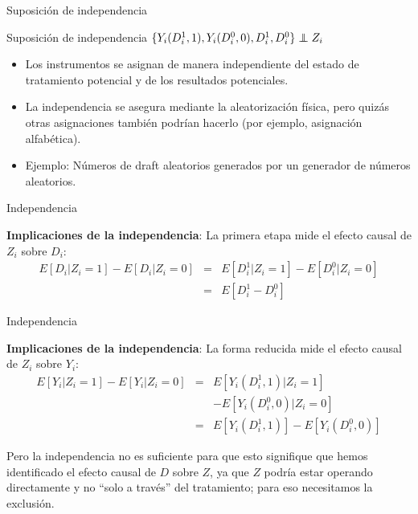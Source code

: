 \documentclass{beamer}
\newcommand\independent{\protect\mathpalette{\protect\independenT}{\perp}}
\def\independenT#1#2{\mathrel{\rlap{$#1#2$}\mkern2mu{#1#2}}}
\begin{document}
\begin{frame}{Suposición de independencia}
	
	\begin{block}{Suposición de independencia}
	$\{Y_i(D^1_i,1),Y_i(D^0_i,0),D^1_{i},D^{0}_i\} \independent{Z}_i$
	\end{block}

\begin{itemize}	
\item Los instrumentos se asignan de manera independiente del estado de tratamiento potencial y de los resultados potenciales.
\item La independencia se asegura mediante la aleatorización física, pero quizás otras asignaciones también podrían hacerlo (por ejemplo, asignación alfabética).
\item Ejemplo: Números de draft aleatorios generados por un generador de números aleatorios.
\end{itemize}

\end{frame}

\begin{frame}{Independencia}

		 \textbf{Implicaciones de la independencia}: La primera etapa mide el efecto causal de $Z_i$ sobre $D_i$:
			\begin{eqnarray*}
			E[D_i|Z_i=1] - E[D_i|Z_i=0] &=& E[D^1_{i} | Z_i = 1] - E[D^0_{i}|Z_i = 0] \\
			&=& E[D^1_{i} - D^0_{i}]
			\end{eqnarray*}

\end{frame}

\begin{frame}{Independencia}

			 \textbf{Implicaciones de la independencia}: La forma reducida mide el efecto causal de $Z_i$ sobre $Y_i$:
			\begin{eqnarray*}
			E[Y_i | Z_i=1] - E[Y_i | Z_i=0] &=& E[Y_i(D^1_{i},1)|Z_i = 1] \\
			&& - E[Y_i(D^0_{i},0) | Z_i = 0] \\
			&=&E[Y_i(D^1_{i},1)] - E[Y_i(D^0_{i},0)]
			\end{eqnarray*}
			
			\bigskip
			
			Pero la independencia no es suficiente para que esto signifique que hemos identificado el efecto causal de $D$ sobre $Z$, ya que $Z$ podría estar operando directamente y no ``solo a través'' del tratamiento; para eso necesitamos la exclusión.
\end{frame}
\end{document}
